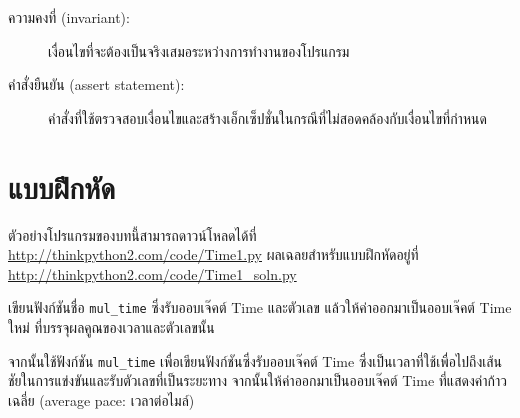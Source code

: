 \begin{description}

\item[ความคงที่ (invariant):] เงื่อนไขที่จะต้องเป็นจริงเสมอระหว่างการทำงานของโปรแกรม


\item[คำสั่งยืนยัน (assert statement):] คำสั่งที่ใช้ตรวจสอบเงื่อนไขและสร้างเอ็กเซ็ปชั่นในกรณีที่ไม่สอดคล้องกับเงื่อนไขที่กำหนด

\end{description}

\section{แบบฝึกหัด}



ตัวอย่างโปรแกรมของบทนี้สามารถดาวน์โหลดได้ที่ \url{http://thinkpython2.com/code/Time1.py} 
ผลเฉลยสำหรับแบบฝึกหัดอยู่ที่ \url{http://thinkpython2.com/code/Time1_soln.py}

\begin{exercise}


เขียนฟังก์ชันชื่อ \verb"mul_time" ซึ่งรับออบเจ๊คต์ Time และตัวเลข แล้วให้ค่าออกมาเป็นออบเจ๊คต์ Time ใหม่ ที่บรรจุผลคูณของเวลาและตัวเลขนั้น


จากนั้นใช้ฟังก์ชัน \verb"mul_time" เพื่อเขียนฟังก์ชันซึ่งรับออบเจ๊คต์ Time 
ซึ่งเป็นเวลาที่ใช้เพื่อไปถึงเส้นชัยในการแข่งขันและรับตัวเลขที่เป็นระยะทาง จากนั้นให้ค่าออกมาเป็นออบเจ๊คต์ Time 
ที่แสดงค่าก้าวเฉลี่ย (average pace: เวลาต่อไมล์)

\end{exercise}


